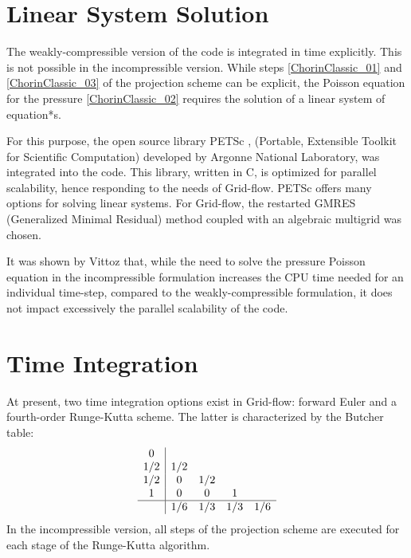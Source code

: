 \documentclass[11pt, a4paper, oneside, openany]{book}
\begin{document}
\section{Linear System Solution}\label{Chapter_Solver_Section_Linear_System_Solution}
The weakly-compressible version of the code is integrated in time explicitly. This is not possible in the incompressible version. While steps \eqref{ChorinClassic_01} and \eqref{ChorinClassic_03} of the projection scheme can be explicit, the Poisson equation for the pressure \eqref{ChorinClassic_02} requires the solution of a linear system of equation*s.\par
For this purpose, the open source library PETSc \cite{petsc-user-ref}\cite{petsc-web-page}, (Portable, Extensible Toolkit for Scientific Computation) developed by Argonne National Laboratory, was integrated into the code. This library, written in C, is optimized for parallel scalability, hence responding to the needs of Grid-flow. PETSc offers many options for solving linear systems. For Grid-flow, the restarted GMRES (Generalized Minimal Residual) method coupled with an algebraic multigrid  was chosen.\par
It was shown by Vittoz \cite{Vittoz2018} that, while the need to solve the pressure Poisson equation in the incompressible formulation increases the CPU time needed for an individual time-step, compared to the weakly-compressible formulation, it does not impact excessively the parallel scalability of the code.
\section{Time Integration}\label{Chapter_Solver_Section_Time_Integration}
At present, two time integration options exist in Grid-flow: forward Euler and a fourth-order Runge-Kutta scheme. The latter is characterized by the Butcher table: %
\begin{equation*}
\begin{array}{c|cccc}
0 &  &  &  & \\
1 / 2 & 1 / 2 &  &  & \\
1 / 2 & 0 & 1 / 2 &  & \\
1 & 0 & 0 & 1 & \\
\hline
 & 1 / 6 & 1 / 3 & 1 / 3 & 1 / 6
\end{array}\label{RK4_Butcher}
\end{equation*}
In the incompressible version, all steps of the projection scheme are executed for each stage of the Runge-Kutta algorithm.
\end{document}
